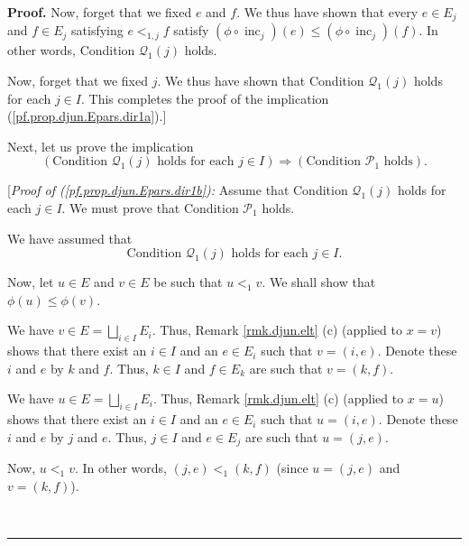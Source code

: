 \documentclass[numbers=enddot,12pt,final,onecolumn,notitlepage,abstracton]{scrartcl}
\theoremstyle{definition}
\newenvironment{proof}[1][Proof]{\noindent\textbf{#1.} }{\ \rule{0.5em}{0.5em}}
\newenvironment{verlong}{}{}
\begin{document}
\begin{verlong}
\begin{footnotesize}
\begin{proof}
Now, forget that we fixed $e$ and $f$. We thus have shown that every $e\in
E_{j}$ and $f\in E_{j}$ satisfying $e<_{1,j}f$ satisfy $\left(  \phi
\circ\operatorname*{inc}\nolimits_{j}\right)  \left(  e\right)  \leq\left(
\phi\circ\operatorname*{inc}\nolimits_{j}\right)  \left(  f\right)  $. In
other words, Condition $\mathcal{Q}_{1}\left(  j\right)  $ holds.

Now, forget that we fixed $j$. We thus have shown that Condition
$\mathcal{Q}_{1}\left(  j\right)  $ holds for each $j\in I$. This completes
the proof of the implication (\ref{pf.prop.djun.Epars.dir1a}).]

Next, let us prove the implication%
\begin{equation}
\left(  \text{Condition }\mathcal{Q}_{1}\left(  j\right)  \text{ holds for
each }j\in I\right)  \Longrightarrow\left(  \text{Condition }\mathcal{P}%
_{1}\text{ holds}\right)  . \label{pf.prop.djun.Epars.dir1b}%
\end{equation}


[\textit{Proof of (\ref{pf.prop.djun.Epars.dir1b}):} Assume that Condition
$\mathcal{Q}_{1}\left(  j\right)  $ holds for each $j\in I$. We must prove
that Condition $\mathcal{P}_{1}$ holds.

We have assumed that%
\begin{equation}
\text{Condition }\mathcal{Q}_{1}\left(  j\right)  \text{ holds for each }j\in
I\text{.} \label{pf.prop.djun.Epars.dir1b.pf.1}%
\end{equation}


Now, let $u\in E$ and $v\in E$ be such that $u<_{1}v$. We shall show that
$\phi\left(  u\right)  \leq\phi\left(  v\right)  $.

We have $v\in E=\bigsqcup_{i\in I}E_{i}$. Thus, Remark \ref{rmk.djun.elt} (c)
(applied to $x=v$) shows that there exist an $i\in I$ and an $e\in E_{i}$ such
that $v=\left(  i,e\right)  $. Denote these $i$ and $e$ by $k$ and $f$. Thus,
$k\in I$ and $f\in E_{k}$ are such that $v=\left(  k,f\right)  $.

We have $u\in E=\bigsqcup_{i\in I}E_{i}$. Thus, Remark \ref{rmk.djun.elt} (c)
(applied to $x=u$) shows that there exist an $i\in I$ and an $e\in E_{i}$ such
that $u=\left(  i,e\right)  $. Denote these $i$ and $e$ by $j$ and $e$. Thus,
$j\in I$ and $e\in E_{j}$ are such that $u=\left(  j,e\right)  $.

Now, $u<_{1}v$. In other words, $\left(  j,e\right)  <_{1}\left(  k,f\right)
$ (since $u=\left(  j,e\right)  $ and $v=\left(  k,f\right)  $).


\end{proof}
\end{footnotesize}
\end{verlong}
\end{document}
